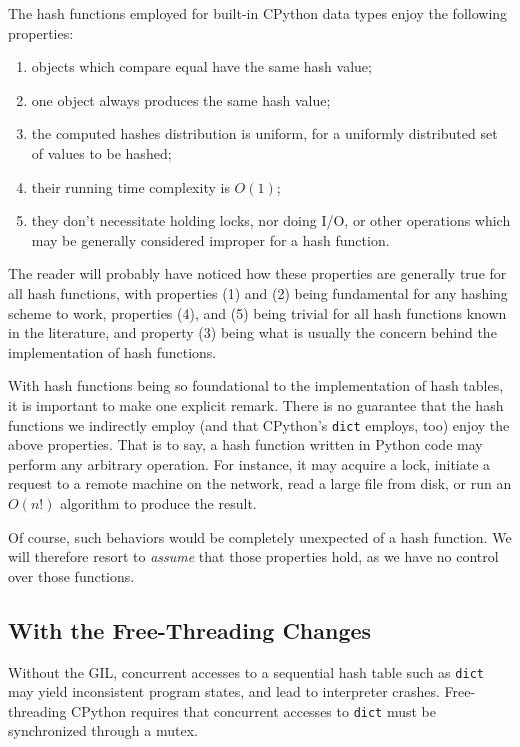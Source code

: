 The hash functions employed for built-in CPython data types enjoy the following properties:
\begin{enumerate}
	\item objects which compare equal have the same hash value;
	\item one object always produces the same hash value;
	\item the computed hashes distribution is uniform, for a uniformly distributed set of values to be hashed;
	\item their running time complexity is $O(1)$;
	\item they don't necessitate holding locks, nor doing I/O, or other operations which may be generally considered improper for a hash function.
\end{enumerate}
The reader will probably have noticed how these properties are generally true for all hash functions, with properties (1) and (2) being fundamental for any hashing scheme to work, properties (4), and (5) being trivial for all hash functions known in the literature, and property (3) being what is usually the concern behind the implementation of hash functions.

With hash functions being so foundational to the implementation of hash tables, it is important to make one explicit remark.
There is no guarantee that the hash functions we indirectly employ (and that CPython's \texttt{dict} employs, too) enjoy the above properties.
That is to say, a hash function written in Python code may perform any arbitrary operation.
For instance, it may acquire a lock, initiate a request to a remote machine on the network, read a large file from disk, or run an $O(n!)$ algorithm to produce the result.

Of course, such behaviors would be completely unexpected of a hash function.
We will therefore resort to \emph{assume} that those properties hold, as we have no control over those functions.


\subsection{With the Free-Threading Changes}\label{subsec:dict-free-threading}

Without the GIL, concurrent accesses to a sequential hash table such as \texttt{dict} may yield inconsistent program states, and lead to interpreter crashes.
Free-threading CPython requires that concurrent accesses to \texttt{dict} must be synchronized through a mutex.

